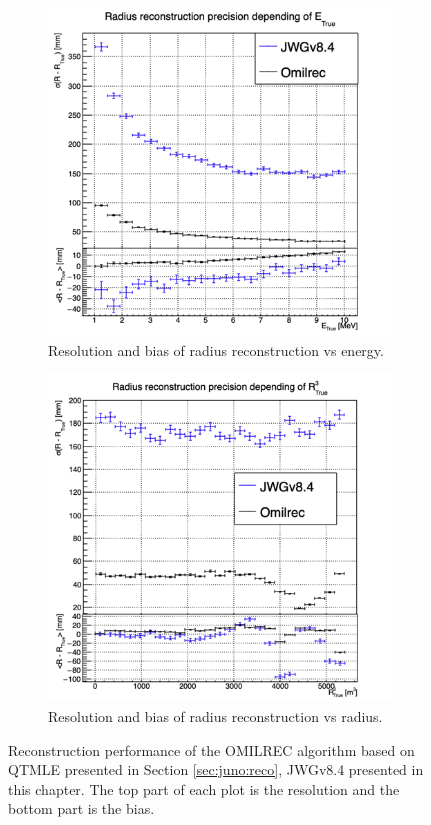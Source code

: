 \documentclass[../main.tex]{subfiles}
\begin{document}
\begin{figure}[ht]
  \begin{subfigure}[t]{0.48\linewidth}
    \centering
    \includegraphics[width=\linewidth]{images/jgnn/MSBvTE_nox.png}
    \caption{Resolution and bias of radius reconstruction vs energy.}
    \label{fig:jgnn:MSBvETC_nox}
  \end{subfigure}
  \begin{subfigure}[t]{0.48\linewidth}
    \centering
    \includegraphics[width=\linewidth]{images/jgnn/MSBvRT_nox.png}
    \caption{Resolution and bias of radius reconstruction vs radius.}
    \label{fig:jgnn:MSBvRTC_nox}
  \end{subfigure}
  \caption{Reconstruction performance of the OMILREC algorithm based on QTMLE presented in Section \ref{sec:juno:reco}, JWGv8.4 presented in this chapter. The top part of each plot is the resolution and the bottom part is the bias.}
  \label{fig:jgnn:results_nox_2}
\end{figure}
\end{document}
